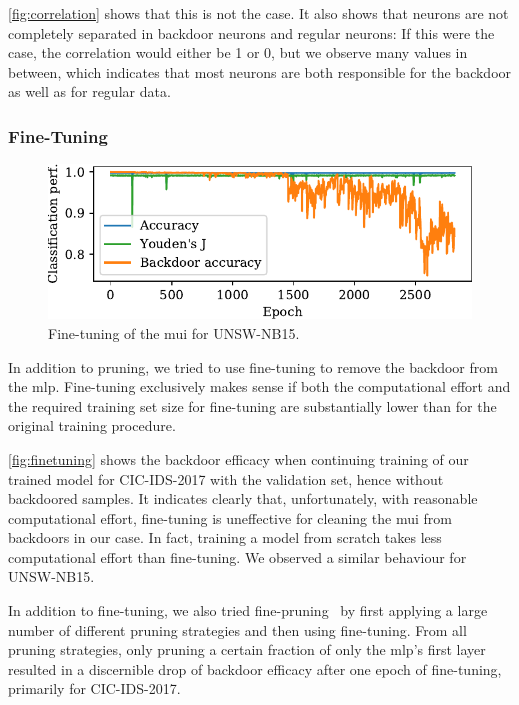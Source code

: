 \documentclass[9pt,sigconf,letterpaper,dvipsnames\ifx\removeHeaders\tempYes ,nonacm\fi]{acmart}
\newcommand\note[2]{{\color{#1}#2}}
\newcommand\todo[1]{{\note{red}{TODO: #1}}}
\newcommand{\unsw}{UNSW-NB15}
\newcommand{\cic}{CIC-IDS-2017}
\begin{document}
\autoref{fig:correlation} shows that this is not the case. It also shows that neurons are not completely separated in backdoor neurons and regular neurons: If this were the case, the correlation would either be 1 or 0, but we observe many values in between, which indicates that most neurons are both responsible for the backdoor as well as for regular data.

\subsubsection{Fine-Tuning}
\begin{figure}[b]
\includegraphics[width=\columnwidth]{figures/finetuning_2017.pdf}
\caption{Fine-tuning of the \gls{mui} for \unsw{}.}
\label{fig:finetuning}
\end{figure}
In addition to pruning, we tried to use fine-tuning to remove the backdoor from the \gls{mlp}. %
Fine-tuning exclusively makes  sense if both the computational effort and the required training set size for fine-tuning are substantially lower than for the original training procedure.

\autoref{fig:finetuning} shows the backdoor efficacy when continuing training of our trained model for \cic{} with the validation set, hence without backdoored samples.
It indicates clearly that, unfortunately, with reasonable computational effort, fine-tuning is uneffective for cleaning the \gls{mui} from backdoors in our case. In fact, training a model from scratch takes less computational effort than fine-tuning. We observed a similar behaviour for \unsw{}.

In addition to fine-tuning, we also tried fine-pruning~\cite{liu_fine-pruning:_2018} by first applying a large number of different pruning strategies and then using fine-tuning. From all pruning strategies, only pruning a certain fraction of only the \gls{mlp}'s first layer resulted in a discernible drop of backdoor efficacy after one epoch of fine-tuning, primarily for \cic{}.
\end{document}
